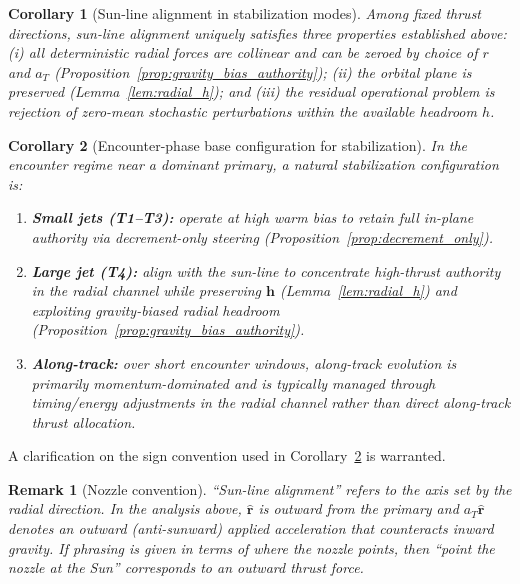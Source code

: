 \documentclass{article}
\newtheorem{corollary}{Corollary}
\newtheorem{remark}{Remark}
\begin{document}
\begin{corollary}[Sun-line alignment in stabilization modes]
\label{cor:sun_pointed}
Among fixed thrust directions, sun-line alignment uniquely satisfies three properties established above: (i) all deterministic radial forces are collinear and can be zeroed by choice of $r$ and $a_T$ (Proposition~\ref{prop:gravity_bias_authority}); (ii) the orbital plane is preserved (Lemma~\ref{lem:radial_h}); and (iii) the residual operational problem is rejection of zero-mean stochastic perturbations within the available headroom $h$.
\end{corollary}

\begin{corollary}[Encounter-phase base configuration for stabilization]
\label{cor:base_config}
In the encounter regime near a dominant primary, a natural stabilization configuration is:
\begin{enumerate}
\item[\textup{(i)}] \textbf{Small jets (T1--T3):} operate at high warm bias to retain full in-plane
authority via decrement-only steering (Proposition~\ref{prop:decrement_only}).
\item[\textup{(ii)}] \textbf{Large jet (T4):} align with the sun-line to concentrate high-thrust
authority in the radial channel while preserving $\mathbf h$ (Lemma~\ref{lem:radial_h}) and exploiting
gravity-biased radial headroom (Proposition~\ref{prop:gravity_bias_authority}).
\item[\textup{(iii)}] \textbf{Along-track:} over short encounter windows, along-track evolution is
primarily momentum-dominated and is typically managed through timing/energy adjustments in the radial
channel rather than direct along-track thrust allocation.
\end{enumerate}
\end{corollary}

A clarification on the sign convention used in Corollary~\ref{cor:base_config} is warranted.

\begin{remark}[Nozzle convention]
``Sun-line alignment'' refers to the \emph{axis} set by the radial direction. In the analysis above, $\hat{\mathbf r}$ is outward from the primary and $a_T\hat{\mathbf r}$ denotes an \emph{outward} (anti-sunward) applied acceleration that counteracts inward gravity. If phrasing is given in terms of where the nozzle points, then ``point the nozzle at the Sun'' corresponds to an outward thrust force.
\end{remark}

\printbibliography
\end{document}

